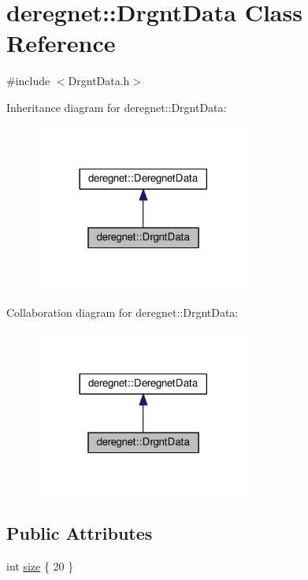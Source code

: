 \hypertarget{classderegnet_1_1DrgntData}{}\section{deregnet\+:\+:Drgnt\+Data Class Reference}
\label{classderegnet_1_1DrgntData}


{\ttfamily \#include $<$Drgnt\+Data.\+h$>$}



Inheritance diagram for deregnet\+:\+:Drgnt\+Data\+:\nopagebreak
\begin{figure}[H]
\begin{center}
\leavevmode
\includegraphics[width=201pt]{classderegnet_1_1DrgntData__inherit__graph}
\end{center}
\end{figure}


Collaboration diagram for deregnet\+:\+:Drgnt\+Data\+:\nopagebreak
\begin{figure}[H]
\begin{center}
\leavevmode
\includegraphics[width=201pt]{classderegnet_1_1DrgntData__coll__graph}
\end{center}
\end{figure}
\subsection*{Public Attributes}
\begin{DoxyCompactItemize}
\item 
int \hyperlink{classderegnet_1_1DrgntData_ae921ab4e0b12be7f488cfd4db2b1623c}{size} \{ 20 \}
\end{DoxyCompactItemize}

